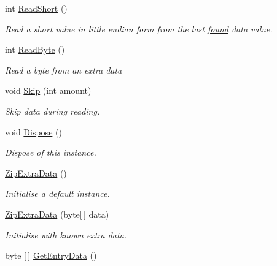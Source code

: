 \begin{DoxyCompactItemize}
int \hyperlink{class_i_c_sharp_code_1_1_sharp_zip_lib_1_1_zip_1_1_zip_extra_data_a13e4cefe2f4873f46fc93cc043852e57}{Read\+Short} ()
\begin{DoxyCompactList}\small\item\em Read a short value in little endian form from the last \hyperlink{class_i_c_sharp_code_1_1_sharp_zip_lib_1_1_zip_1_1_zip_extra_data_a91e0c6c1d11967653256ccb161f9818c}{found} data value. \end{DoxyCompactList}\item 
int \hyperlink{class_i_c_sharp_code_1_1_sharp_zip_lib_1_1_zip_1_1_zip_extra_data_ae4b31cc84f7085ace9656c3bff5bd3cc}{Read\+Byte} ()
\begin{DoxyCompactList}\small\item\em Read a byte from an extra data \end{DoxyCompactList}\item 
void \hyperlink{class_i_c_sharp_code_1_1_sharp_zip_lib_1_1_zip_1_1_zip_extra_data_afb83d24996e6234cdd6ed3b03785ec9c}{Skip} (int amount)
\begin{DoxyCompactList}\small\item\em Skip data during reading. \end{DoxyCompactList}\item 
void \hyperlink{class_i_c_sharp_code_1_1_sharp_zip_lib_1_1_zip_1_1_zip_extra_data_a05471c32c736f77ac7855925048988ef}{Dispose} ()
\begin{DoxyCompactList}\small\item\em Dispose of this instance. \end{DoxyCompactList}\item 
\hyperlink{class_i_c_sharp_code_1_1_sharp_zip_lib_1_1_zip_1_1_zip_extra_data_a16c63f6fd53ff88f18cd509fce6ba9e0}{Zip\+Extra\+Data} ()
\begin{DoxyCompactList}\small\item\em Initialise a default instance. \end{DoxyCompactList}\item 
\hyperlink{class_i_c_sharp_code_1_1_sharp_zip_lib_1_1_zip_1_1_zip_extra_data_a502553a7e72471833236dad3f46ab409}{Zip\+Extra\+Data} (byte\mbox{[}$\,$\mbox{]} data)
\begin{DoxyCompactList}\small\item\em Initialise with known extra data. \end{DoxyCompactList}\item 
byte \mbox{[}$\,$\mbox{]} \hyperlink{class_i_c_sharp_code_1_1_sharp_zip_lib_1_1_zip_1_1_zip_extra_data_a89f01603c315e957a094a40756dd1cf9}{Get\+Entry\+Data} ()

\end{DoxyCompactItemize}
